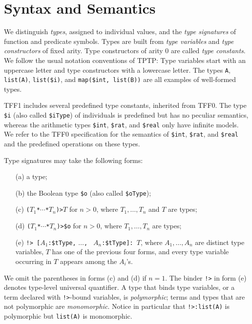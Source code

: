 \section{Syntax and Semantics} \label{sec_logic}

We distinguish {\em types}, assigned
to individual values, and the {\em type signatures\/} of function and predicate symbols.
Types are built from {\em type variables\/}
and {\em type constructors\/} of fixed arity. Type constructors
of arity 0 are called {\em type constants}. We follow the usual
notation conventions of TPTP: Type variables start with an
uppercase letter and type constructors with a lowercase letter.
The types \verb+A+, \verb+list(A)+, \verb+list($i)+, and
\verb+map($int,+~\verb+list(B))+ are all examples of well-formed types.

TFF1 includes several predefined type constants, inherited from TFF0.
The type \verb+$i+ (also called \verb+$iType+) of individuals is predefined
but has no peculiar semantics, whereas the arithmetic types
\verb+$int+, \verb+$rat+, and \verb+$real+ only have infinite models. We refer
to the TFF0 specification \cite{TFF0} for the semantics of
\verb+$int+, \verb+$rat+, and \verb+$real+ and the predefined operations on
these types. %

Type signatures may take the following forms:
%
\begin{enumerate}
\item[(a)] a type;
\item[(b)] the Boolean type \verb+$o+ (also called \verb+$oType+);
\item[(c)] {\tt ($T_1$\;*\;${\cdots}$\;*\;$T_n$)\;>\;$T$} for $n > 0$,
where $T_1,\dots,T_n$ and $T$ are types;
\item[(d)] {\tt ($T_1$\;*\;${\cdots}$\;*\;$T_n$)\;>\;\$o} for $n > 0$,
where $T_1,\dots,T_n$ are types;
\item[(e)] {\tt !>\ [$A_1$\;:\;\$tType,} {\tt ${\dots}$,} {\tt
$A_n$\;:\;\$tType]:\ $T$}, where $A_1,\dots,A_n$ are distinct type variables, $T$
has one of the previous four forms, and every type variable occurring in $T$
appears among the $A_i$'s.
\end{enumerate}
%
We omit the parentheses in forms (c) and (d) if $n = 1$. The binder {\tt !>} in
form (e) denotes type-level universal quantifier. A type that binds type
variables, or a term declared with {\tt !>}-bound variables, is {\em
polymorphic}; terms and types that are not polymorphic are {\em monomorphic}.
Notice in particular that {\tt !>\;[$A$\;:\;\$tType]:\;list(A)} is polymorphic
but {\tt list(A)} is monomorphic.

